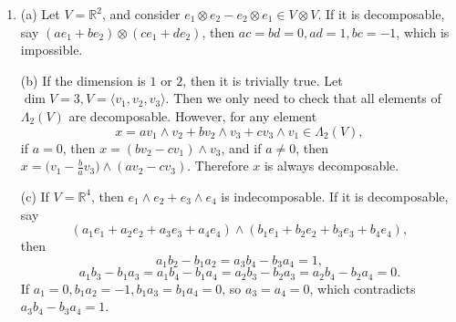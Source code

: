 \begin{enumerate}
(1) Let $\{v_{i}\},\{w_{j}\}$ be a basis of $V, W$, respectively, 
and $\{v_{i}^{*}\}$ be the dual basis corresponding to $\{v_{i}\}$, i.e., $v_{a}^{*}(v_{b})=\delta_{ab}$. 
Then elements of $V^{*} \otimes W$ can be represented as $\sum_{i, j} a_{i j} v_{i}^{*} \otimes w_{j}$. 
If $\alpha\big(\sum_{i, j} a_{ij} v_{i}^{*} \otimes w_{j}\big)=0$, 
then $\forall v \in V, \sum_{i, j} a_{ij} v_{i}^{*}(v) \cdot w_{j}=0$. 
In particular, if one substitutes $v_{i}$ for $v$, then $\sum_{j} a_{ij} w_{j}=0, \forall i$. 
Therefore, by the linear independence of the basis, $a_{ij}=0, \forall i, j$, and it means $\alpha$ is injective.

(2) Let $\varphi \in \operatorname{Hom}(V, W)$. Then if $\varphi(v_{i})=\sum_{j} a_{i j} w_{j}$, 
set $\psi=\alpha\big(\sum_{i, j} a_{ij} \otimes w_{j}\big)$. 
Then $\psi$ and $\varphi$ have the same value at $v_{i}$, so they must be the same linear map. Therefore, $\alpha$ is surjective.
Therefore, $\alpha$ is an isomorphism. Hence, $\dim V^{*} \otimes W=\dim \operatorname{Hom}(V, W)=(\dim V)(\dim W)$, 
and $\dim V \otimes W=\dim V^{**} \otimes W=\left(\dim V^{*}\right)(\dim W)=(\dim V)(\dim W)$.

(e) By arguments similar to the above, $\left\{e_{i} \otimes f_{j}\right\}$ span $V \otimes W$. Since the number of $\left\{e_{i} \otimes f_{j}\right\}$ is the same as the dimension of $V \otimes W$ by (d), it must be a basis.
\item (a) Let $V=\mathbb{R}^{2}$, and consider $e_{1} \otimes e_{2}-e_{2} \otimes e_{1} \in V \otimes V$. If it is decomposable, say $\left(a e_{1}+b e_{2}\right) \otimes\left(c e_{1}+d e_{2}\right)$, then $a c=b d=0, a d=1, b c=-1$, which is impossible.

(b) If the dimension is $1$ or $2$, then it is trivially true. 
Let $\dim V=3, V=\langle v_{1}, v_{2}, v_{3}\rangle$. 
Then we only need to check that all elements of $\Lambda_{2}(V)$ are decomposable. 
However, for any element
\[x=a v_{1} \wedge v_{2}+b v_{2} \wedge v_{3}+c v_{3} \wedge v_{1} \in \Lambda_{2}(V),\]
if $a=0$, then $x=(b v_{2}-c v_{1}) \wedge v_{3}$, and if $a \neq 0$, 
then $x=\big(v_{1}-\frac{b}{a} v_{3}\big) \wedge(a v_{2}-c v_{3})$. Therefore $x$ is always decomposable.

(c) If $V=\mathbb{R}^{4}$, then $e_{1} \wedge e_{2}+e_{3} \wedge e_{4}$ is indecomposable. If it is decomposable, say
\[(a_{1} e_{1}+a_{2} e_{2}+a_{3} e_{3}+a_{4} e_{4}) \wedge (b_{1} e_{1}+b_{2} e_{2}+b_{3} e_{3}+b_{4} e_{4}),\]
then \[a_{1} b_{2}-b_{1} a_{2}=a_{3} b_{4}-b_{3} a_{4}=1,\]
\[a_{1} b_{3}-b_{1} a_{3}=a_{1} b_{4}-b_{1} a_{4}
=a_{2} b_{3}-b_{2} a_{3}=a_{2} b_{4}-b_{2} a_{4}=0.\]
If $a_{1}=0, b_{1} a_{2}=-1, b_{1} a_{3}=b_{1} a_{4}=0$, so $a_{3}=a_{4}=0$, which contradicts $a_{3} b_{4}-b_{3} a_{4}=1$.


\end{enumerate}
